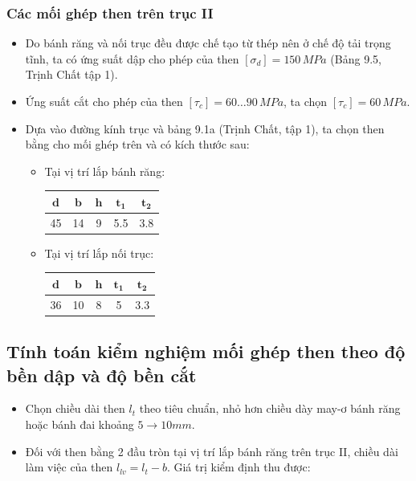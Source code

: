 \subsubsection{Các mối ghép then trên trục II}
\begin{itemize}
    \item Do bánh răng và nối trục đều được chế tạo từ thép nên ở chế độ tải trọng tĩnh, ta có ứng suất dập cho phép của then $[\sigma_d] = 150 \, MPa$ (Bảng 9.5, Trịnh Chất tập 1).
    \item Ứng suất cắt cho phép của then $[\tau_c] = 60 \dots 90 \, MPa$, ta chọn $[\tau_c] = 60 \, MPa$.
    \item Dựa vào đường kính trục và bảng 9.1a (Trịnh Chất, tập 1), ta chọn then bằng cho mối ghép trên và có kích thước sau:
    \begin{itemize}
        \item Tại vị trí lắp bánh răng:
        \begin{table}[h!]
        \centering
        \begin{tabular}{|c|c|c|c|c|}
        \hline
        $\mathbf{d}$ & $\mathbf{b}$ & $\mathbf{h}$ & $\mathbf{t_1}$ & $\mathbf{t_2}$ \\
        \hline
        45 & 14 & 9 & 5.5 & 3.8 \\
        \hline
        \end{tabular}
        \end{table}
        \item Tại vị trí lắp nối trục:
        \begin{table}[h!]
        \centering
        \begin{tabular}{|c|c|c|c|c|}
        \hline
        $\mathbf{d}$ & $\mathbf{b}$ & $\mathbf{h}$ & $\mathbf{t_1}$ & $\mathbf{t_2}$ \\
        \hline
        36 & 10 & 8 & 5 & 3.3 \\
        \hline
        \end{tabular}
        \end{table}
    \end{itemize}
\end{itemize}
\subsection{Tính toán kiểm nghiệm mối ghép then theo độ bền dập và độ bền cắt}
\begin{itemize}
    \item Chọn chiều dài then $l_t$ theo tiêu chuẩn, nhỏ hơn chiều dày may-ơ bánh răng hoặc bánh đai khoảng $5 \rightarrow 10mm$.
    \item Đối với then bằng 2 đầu tròn tại vị trí lắp bánh răng trên trục II, chiều dài làm việc của then $l_{lv} = l_t - b$. Giá trị kiểm định thu được:
\end{itemize}

